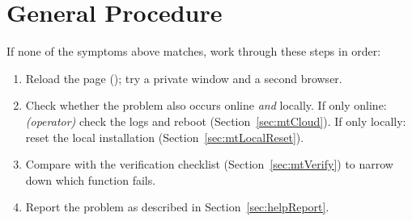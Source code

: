 \section{General Procedure}
\label{sec:tsGeneral}

If none of the symptoms above matches, work through these steps in order:
\begin{enumerate}
  \item Reload the page (); try a private window and a second browser.
  \item Check whether the problem also occurs online \emph{and} locally. If only online: \emph{(operator)} check the logs and reboot (Section~\ref{sec:mtCloud}). If only locally: reset the local installation (Section~\ref{sec:mtLocalReset}).
  \item Compare with the verification checklist (Section~\ref{sec:mtVerify}) to narrow down which function fails.
  \item Report the problem as described in Section~\ref{sec:helpReport}.
\end{enumerate}

